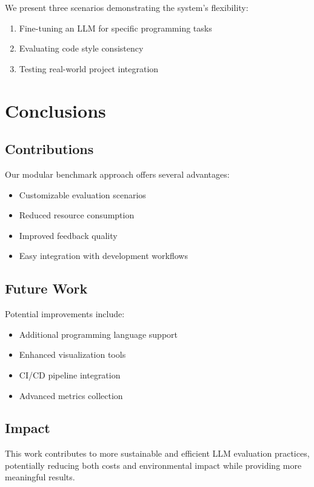 We present three scenarios demonstrating the system's flexibility:
\begin{enumerate}
    \item Fine-tuning an LLM for specific programming tasks
    \item Evaluating code style consistency
    \item Testing real-world project integration
\end{enumerate}

\chapter{Conclusions}

\section{Contributions}

Our modular benchmark approach offers several advantages:
\begin{itemize}
    \item Customizable evaluation scenarios
    \item Reduced resource consumption
    \item Improved feedback quality
    \item Easy integration with development workflows
\end{itemize}

\section{Future Work}

Potential improvements include:
\begin{itemize}
    \item Additional programming language support
    \item Enhanced visualization tools
    \item CI/CD pipeline integration
    \item Advanced metrics collection
\end{itemize}

\section{Impact}

This work contributes to more sustainable and efficient LLM evaluation practices, potentially reducing both costs and environmental impact while providing more meaningful results.
